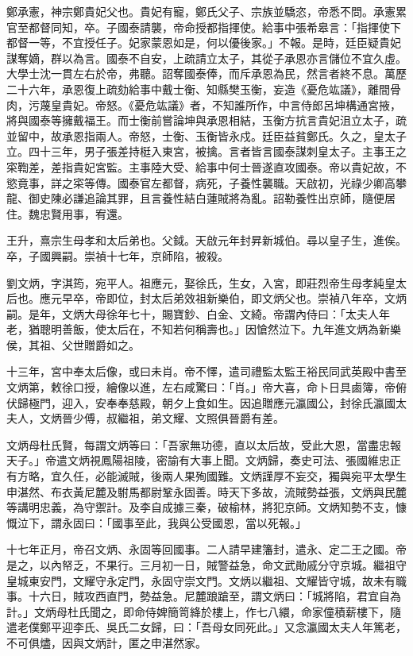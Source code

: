 \begin{pinyinscope}
鄭承憲，神宗鄭貴妃父也。貴妃有寵，鄭氏父子、宗族並驕恣，帝悉不問。承憲累官至都督同知，卒。子國泰請襲，帝命授都指揮使。給事中張希皋言：「指揮使下都督一等，不宜授任子。妃家蒙恩如是，何以優後家。」不報。是時，廷臣疑貴妃謀奪嫡，群以為言。國泰不自安，上疏請立太子，其從子承恩亦言儲位不宜久虛。大學士沈一貫左右於帝，弗聽。詔奪國泰俸，而斥承恩為民，然言者終不息。萬歷二十六年，承恩復上疏劾給事中戴士衡、知縣樊玉衡，妄造《憂危竑議》，離間骨肉，污蔑皇貴妃。帝怒。《憂危竑議》者，不知誰所作，中言侍郎呂坤構通宮掖，將與國泰等擁戴福王。而士衡前嘗論坤與承恩相結，玉衡方抗言貴妃沮立太子，疏並留中，故承恩指兩人。帝怒，士衡、玉衡皆永戍。廷臣益貧鄭氏。久之，皇太子立。四十三年，男子張差持梃入東宮，被擒。言者皆言國泰謀刺皇太子。主事王之寀鞫差，差指貴妃宮監。主事陸大受、給事中何士晉遂直攻國泰。帝以貴妃故，不慾竟事，詳之寀等傳。國泰官左都督，病死，子養性襲職。天啟初，光祿少卿高攀龍、御史陳必謙追論其罪，且言養性結白蓮賊將為亂。詔勒養性出京師，隨便居住。魏忠賢用事，宥還。

王升，熹宗生母孝和太后弟也。父鉞。天啟元年封昇新城伯。尋以皇子生，進俟。卒，子國興嗣。崇禎十七年，京師陷，被殺。

劉文炳，字淇筠，宛平人。祖應元，娶徐氏，生女，入宮，即莊烈帝生母孝純皇太后也。應元早卒，帝即位，封太后弟效祖新樂伯，即文炳父也。崇禎八年卒，文炳嗣。是年，文炳大母徐年七十，賜寶鈔、白金、文綺。帝謂內侍曰：「太夫人年老，猶聰明善飯，使太后在，不知若何稱壽也。」因愴然泣下。九年進文炳為新樂侯，其祖、父世贈爵如之。

十三年，宮中奉太后像，或曰未肖。帝不懌，遣司禮監太監王裕民同武英殿中書至文炳第，敕徐口授，繪像以進，左右咸驚曰：「肖。」帝大喜，命卜日具鹵簿，帝俯伏歸極門，迎入，安奉奉慈殿，朝夕上食如生。因追贈應元瀛國公，封徐氏瀛國太夫人，文炳晉少傅，叔繼祖，弟文耀、文照俱晉爵有差。

文炳母杜氏賢，每謂文炳等曰：「吾家無功德，直以太后故，受此大恩，當盡忠報天子。」帝遣文炳視鳳陽祖陵，密諭有大事上聞。文炳歸，奏史可法、張國維忠正有方略，宜久任，必能滅賊，後兩人果殉國難。文炳謹厚不妄交，獨與宛平太學生申湛然、布衣黃尼麓及駙馬都尉鞏永固善。時天下多故，流賊勢益張，文炳與民麓等講明忠義，為守禦計。及李自成據三秦，破榆林，將犯京師。文炳知勢不支，慷慨泣下，謂永固曰：「國事至此，我與公受國恩，當以死報。」

十七年正月，帝召文炳、永固等回國事。二人請早建籓封，遣永、定二王之國。帝是之，以內帑乏，不果行。三月初一日，賊警益急，命文武勛戚分守京城。繼祖守皇城東安門，文耀守永定門，永固守崇文門。文炳以繼祖、文耀皆守城，故未有職事。十六日，賊攻西直門，勢益急。尼麓踉蹌至，謂文炳曰：「城將陷，君宜自為計。」文炳母杜氏聞之，即命侍婢簡笥絳於樓上，作七八繯，命家僮積薪樓下，隨遣老僕鄭平迎李氏、吳氏二女歸，曰：「吾母女同死此。」又念瀛國太夫人年篤老，不可俱燼，因與文炳計，匿之申湛然家。


\end{pinyinscope}
